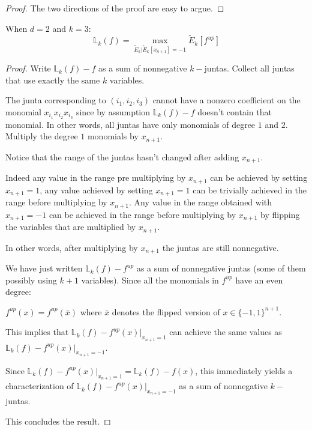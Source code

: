 \begin{proof}
The two directions of the proof are easy to argue.
\end{proof}

\begin{lemma}
When $d =2$ and $k = 3$:
\begin{equation}
\mathbb{L}_k(f) = \max_{\tilde{E}_k | \tilde{E}_k[x_{n+1}] = -1 } \tilde{E}_k[f^{up}]
\end{equation}
\end{lemma}

\begin{proof}
Write $\mathbb{L}_k(f) - f$ as a sum of nonnegative $k-$juntas. Collect all juntas that use exactly the same $k$ variables. 

The junta corresponding to $(i_1,i_2,i_3)$ cannot have a nonzero coefficient on the monomial $x_{i_1}x_{i_2}x_{i_3}$ since by assumption $\mathbb{L}_k(f) - f$ doesn't contain that monomial. In other words, all juntas have only monomials of degree $1$ and $2$. Multiply the degree $1$ monomials by $x_{n+1}$. 

Notice that the range of the juntas hasn't changed after adding $x_{n+1}$.  

Indeed any value in the range pre multiplying by $x_{n+1}$ can be achieved by setting $x_{n+1} = 1$, any value achieved by setting $x_{n+1} = 1$ can be trivially achieved in the range before multiplying by $x_{n+1}$. Any value in the range obtained with $x_{n+1} = -1$ can be achieved in the range before multiplying by $x_{n+1}$ by flipping the variables that are multiplied by $x_{n+1}$.

In other words, after multiplying by $x_{n+1}$ the juntas are still nonnegative. 

We have just written $\mathbb{L}_k(f) - f^{up}$ as a sum of nonnegative juntas (some of them possibly using $k+1$ variables). Since all the monomials in $f^{up}$ have an even degree: 

$f^{up}(x) = f^{up}(\bar{x})$ where $\bar{x}$ denotes the flipped version of $x \in \{ -1,1\}^{n+1}$.

This implies that $\mathbb{L}_k(f) -f^{up}(x)|_{x_{n+1} = 1}$ can achieve the same values as $\mathbb{L}_k(f) -f^{up}(x)|_{x_{n+1} = -1}$. 

Since $\mathbb{L}_k(f) -f^{up}(x)|_{x_{n+1} = 1} = \mathbb{L}_k(f) -f(x)$, this immediately yields a characterization of $\mathbb{L}_k(f) -f^{up}(x)|_{x_{n+1} = -1}$ as a sum of nonnegative $k-$juntas. 

This concludes the result. 

\end{proof}


